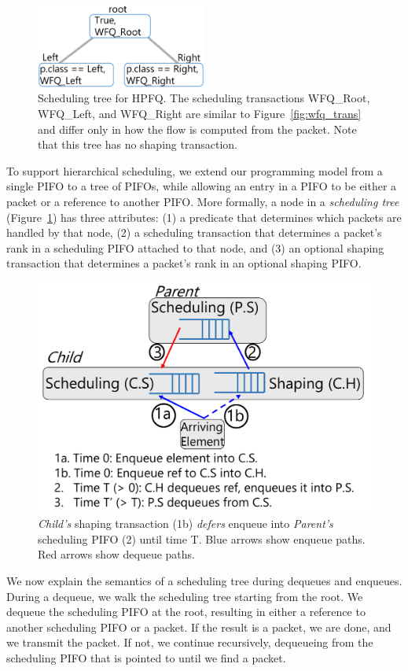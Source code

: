 \begin{figure}[!t]
\centering
\includegraphics[width=0.5\textwidth]{pifo_hpfq_program.pdf}
\caption{Scheduling tree for HPFQ. The scheduling transactions WFQ\_Root,
WFQ\_Left, and WFQ\_Right are similar to Figure~\ref{fig:wfq_trans} and differ
only in how the flow is computed from the packet. Note that this tree has no
shaping transaction.}
\label{fig:scheduling_tree}
\end{figure}

To support hierarchical scheduling, we extend our programming model from a
single PIFO to a tree of PIFOs, while allowing an entry in a PIFO to be either
a packet or a reference to another PIFO. More formally, a node in a {\em
scheduling tree} (Figure~\ref{fig:scheduling_tree}) has three attributes: (1) a
predicate that determines which packets are handled by that node, (2) a
scheduling transaction that determines a packet's rank in a scheduling PIFO
attached to that node, and (3) an optional shaping transaction that determines
a packet's rank in an optional shaping PIFO.

\begin{figure}[!t]
  \centering
  \includegraphics[width=0.6\columnwidth]{pifo_shaping_semantics.pdf}
  \caption{\textit{Child's} shaping transaction (1b) {\em defers} enqueue
  into \textit{Parent's} scheduling PIFO (2) until time T.  Blue arrows
  show enqueue paths. Red arrows show dequeue paths.  }
  \label{fig:shaping_timing}
\end{figure}

We now explain the semantics of a scheduling tree during dequeues and enqueues.
During a dequeue, we walk the scheduling tree starting from the root. We
dequeue the scheduling PIFO at the root, resulting in either a reference to
another scheduling PIFO or a packet. If the result is a packet, we are done,
and we transmit the packet. If not, we continue recursively, dequeueing from
the scheduling PIFO that is pointed to until we find a packet.

